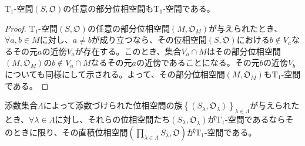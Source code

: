 \documentclass[dvipdfmx]{jsarticle}
\begin{document}
\begin{thm}\label{8.1.7.4}
$\mathrm{T}_{1}$-空間$\left( S,\mathfrak{O} \right)$の任意の部分位相空間も$\mathrm{T}_{1}$-空間である。
\end{thm}
\begin{proof}
$\mathrm{T}_{1}$-空間$\left( S,\mathfrak{O} \right)$の任意の部分位相空間$\left( M,\mathfrak{O}_{M} \right)$が与えられたとき、$\forall a,b \in M$に対し、$a \neq b$が成り立つなら、その位相空間$\left( S,\mathfrak{O} \right)$における$b \notin V_{a}$なるその元$a$の近傍$V_{a}$が存在する。このとき、集合$V_{a} \cap M$はその部分位相空間$\left( M,\mathfrak{O}_{M} \right)$の$b \notin V_{a} \cap M$なるその元$a$の近傍であることになる。その元$b$の近傍$V_{b}$についても同様にして示される。よって、その部分位相空間$\left( M,\mathfrak{O}_{M} \right)$も$\mathrm{T}_{1}$-空間である。
\end{proof}
\begin{thm}\label{8.1.7.5}
添数集合$\varLambda$によって添数づけられた位相空間の族$\left\{ \left( S_{\lambda},\mathfrak{O}_{\lambda} \right) \right\}_{\lambda \in \varLambda}$が与えられたとき、$\forall\lambda \in \varLambda$に対し、それらの位相空間たち$\left( S_{\lambda},\mathfrak{O}_{\lambda} \right)$が$\mathrm{T}_{1}$-空間であるならそのときに限り、その直積位相空間$\left( \prod_{\lambda \in \varLambda} S_{\lambda},\mathfrak{O} \right)$が$\mathrm{T}_{1}$-空間である。
\end{thm}
\end{document}
